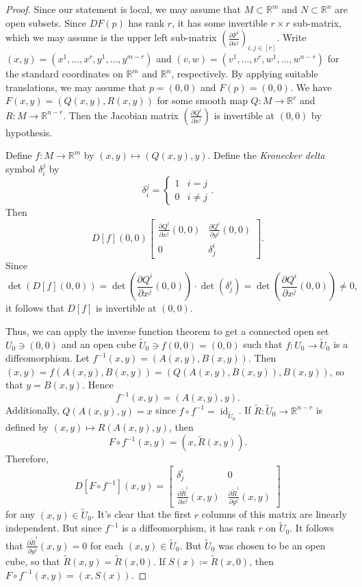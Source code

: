 \documentclass[10pt,letterpaper,cm]{nupset}
\theoremstyle{definition}
\theoremstyle{theorem}
\theoremstyle{remark}
\newcommand{\R}{\mathbb R}
\newcommand{\1}{\mathbf{1}}
\newcommand{\0}{\vec 0}
\DeclareMathOperator{\id}{id}
\begin{document}
\begin{proof}
Since our statement is local, we may assume that $M\subset \R^m$ and $N\subset \R^n$ are open subsets. Since $DF(p)$ has rank $r$, it has some invertible $r\times r$ sub-matrix, which we may assume is the upper left sub-matrix $\left(\frac{\partial{F^i}}{\partial{x^j}}\right)_{i,j\in [r]}$. Write $(x,y) = (x^1, \ldots, x^r, y^1, \ldots, y^{m-r})$ and $(v,w) = (v^1, \ldots, v^r, w^1, \ldots, w^{n-r})$ for the standard coordinates on $\R^m$ and $\R^n$, respectively. By applying suitable translations, we may assume that $p=(0,0)$ and $F(p)= (0,0)$. We have $F(x,y)= (Q(x,y), R(x,y))$ for some smooth map $Q: M \to \R^r$ and $R: M \to \R^{n-r}$. Then the Jacobian matrix $\left(\frac{\partial{Q^i}}{\partial{x^j}} \right)$ is invertible at $(0,0)$ by hypothesis. 

\medskip


Define $f : M \to \R^m$ by $(x,y) \mapsto (Q(x,y), y)$. Define the \textit{Kronecker delta} symbol $\delta_i^j$ by 
$$\delta_i^j = \begin{cases} 1 & i=j \\ 0 & i \ne j \end{cases}.$$  Then $$D[f](0,0) \begin{bmatrix} \frac{\partial{Q^i}}{\partial{x^j}}(0,0) & \frac{\partial{Q^i}}{\partial{y^j}}(0,0) \\ 0 & \delta^i_j     \end{bmatrix}   .$$ Since $$\det(D[f](0,0)) = \det \left( \frac{\partial{Q^i}}{\partial{x^j}}(0,0) \right) \cdot \det(\delta^i_j) = \det \left( \frac{\partial{Q^i}}{\partial{x^j}}(0,0)  \right) \ne 0,$$ it follows that $D[f]$ is invertible at $(0,0)$. 

\medskip

 Thus, we can apply the inverse function theorem to get a connected open set $U_0 \ni (0,0)$ and an open cube $\widetilde{U}_0 \ni f(0,0) = (0,0)$ such that $f: U_0 \to \widetilde{U}_0$ is a diffeomorphism.  Let $f^{-1}(x,y) =(A(x,y), B(x,y))$. Then $(x,y) = f(A(x,y), B(x,y)) = (Q(A(x,y), B(x,y)), B(x,y))$, so that $y = B(x,y)$. Hence $$f^{-1}(x,y) = (A(x,y), y).$$ Additionally, $Q(A(x,y), y)=x$ since $f\circ f^{-1} = \id_{\widetilde{U}_0}$. If $\widetilde{R} : \widetilde{U}_0 \to \R^{n-r}$ is defined by $(x,y) \mapsto R(A(x,y), y)$, then $$F\circ f^{-1}(x,y) = \left(x, \widetilde{R}(x,y)\right).$$ Therefore, $$D[F\circ f^{-1}](x,y)  =  \begin{bmatrix}    \delta^i_j & 0 \\ 
\frac{\partial{\widetilde{R}^i}}{\partial{x^j}}(x,y) & \frac{\partial{\widetilde{R}^i}}{\partial{y^j}}(x,y)    \end{bmatrix} $$ for any $(x,y) \in \widetilde{U}_0$. It's clear that the first $r$ columns of this matrix are linearly independent. But since $f^{-1}$ is a diffeomorphism, it has rank $r$ on $\widetilde{U}_0$. It follows that $ \frac{\partial{\widetilde{R}^i}}{\partial{y^j}}(x,y) =0$ for each $(x,y) \in \widetilde{U}_0$. But $\widetilde{U}_0$ was chosen to be an open cube, so that $\widetilde{R}(x,y) = \widetilde{R}(x,0)$. If $S(x) \coloneqq \widetilde{R}(x,0)$, then $F \circ f^{-1}(x,y) = (x, S(x))$. 


\end{proof}
\end{document}

